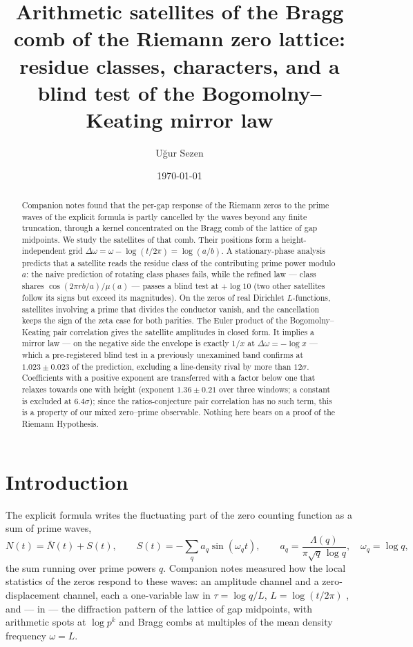 \documentclass[12pt]{amsart}
\title[Arithmetic satellites of the Riemann zero comb]{Arithmetic
satellites of the Bragg comb of the Riemann zero lattice:\\ residue
classes, characters, and a blind test of the Bogomolny--Keating mirror
law}
\author{U\u{g}ur Sezen}
\date{\today}
\begin{document}
\begin{abstract}
Companion notes found that the per-gap response of the Riemann zeros to
the prime waves of the explicit formula is partly cancelled by the waves
beyond any finite truncation, through a kernel concentrated on the Bragg
comb of the lattice of gap midpoints. We study the satellites of that
comb. Their positions form a height-independent grid
$\Delta\omega = \omega - \log(t/2\pi) = \log(a/b)$. A stationary-phase
analysis predicts that a satellite reads the residue class of the
contributing prime power modulo $a$: the naive prediction of rotating
class phases fails, while the refined law --- class shares
$\cos(2\pi rb/a)/\mu(a)$ --- passes a blind test at $+\log 10$ (two other
satellites follow its signs but exceed its magnitudes). On the zeros of
real Dirichlet $L$-functions, satellites involving a prime that divides
the conductor vanish, and the cancellation keeps the sign of the zeta
case for both parities. The Euler product of the Bogomolny--Keating pair
correlation gives the satellite amplitudes in closed form. It implies a
mirror law --- on the negative side the envelope is exactly $1/x$ at
$\Delta\omega = -\log x$ --- which a pre-registered blind test in a
previously unexamined band confirms at $1.023 \pm 0.023$ of the
prediction, excluding a line-density rival by more than $12\sigma$.
Coefficients with a positive exponent are transferred with a factor
below one that relaxes towards one with height (exponent
$1.36 \pm 0.21$ over three windows; a constant is excluded at
$6.4\sigma$); since the ratios-conjecture pair correlation has no such
term, this is a property of our mixed zero--prime observable. Nothing
here bears on a proof of the Riemann Hypothesis.
\end{abstract}

\maketitle

\section{Introduction}

The explicit formula writes the fluctuating part of the zero counting
function as a sum of prime waves,
\begin{equation}\label{eq:S}
N(t) = \bar N(t) + S(t), \qquad
S(t) = -\sum_{q} a_q \sin(\omega_q t), \qquad
a_q = \frac{\Lambda(q)}{\pi\sqrt{q}\,\log q},\quad \omega_q = \log q,
\end{equation}
the sum running over prime powers $q$. Companion notes
\cite{companion1,companion2,companion3,companion4} measured how the local
statistics of the zeros respond to these waves: an amplitude channel and a
zero-displacement channel, each a one-variable law in
$\tau = \log q/L$, $L = \log(t/2\pi)$ \cite{companion2,companion3}, and
--- in \cite{companion4} --- the diffraction pattern of the lattice of gap
midpoints, with arithmetic spots at $\log p^k$ and Bragg combs at
multiples of the mean density frequency $\omega = L$.
\end{document}
